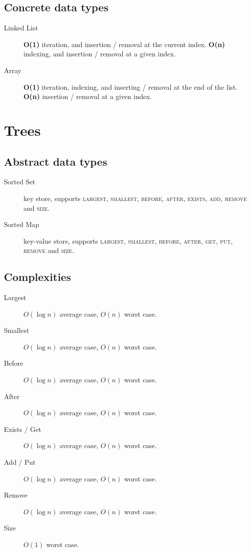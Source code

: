 \documentclass[landscape]{cheat}
\begin{document}
\begin{multicols}{3}
\subsection{Concrete data types}
\begin{description}
    \item[Linked List]
        \textbf{O(1)} iteration, and insertion / removal at the current index.
        \textbf{O(n)} indexing, and insertion / removal at a given index.
    \item[Array]
        \textbf{O(1)} iteration, indexing, and inserting / removal at the end of the list.
        \textbf{O(n)} insertion / removal at a given index.
\end{description}

\section{Trees}

\subsection{Abstract data types}
\begin{description}
    \item[Sorted Set]
        key store,
        supports \textsc{largest}, \textsc{smallest}, \textsc{before}, \textsc{after},
        \textsc{exists}, \textsc{add}, \textsc{remove} and \textsc{size}.
    \item[Sorted Map]
        key-value store,
        supports \textsc{largest}, \textsc{smallest}, \textsc{before}, \textsc{after},
        \textsc{get}, \textsc{put}, \textsc{remove} and \textsc{size}.
\end{description}

\subsection{Complexities}
\begin{description}
    \item[Largest] $O(\log n)$ average case, $O(n)$ worst case.
    \item[Smallest] $O(\log n)$ average case, $O(n)$ worst case.
    \item[Before] $O(\log n)$ average case, $O(n)$ worst case.
    \item[After] $O(\log n)$ average case, $O(n)$ worst case.
    \item[Exists / Get] $O(\log n)$ average case, $O(n)$ worst case.
    \item[Add / Put] $O(\log n)$ average case, $O(n)$ worst case.
    \item[Remove] $O(\log n)$ average case, $O(n)$ worst case.
    \item[Size] $O(1)$ worst case.
\end{description}


\end{multicols}
\end{document}
